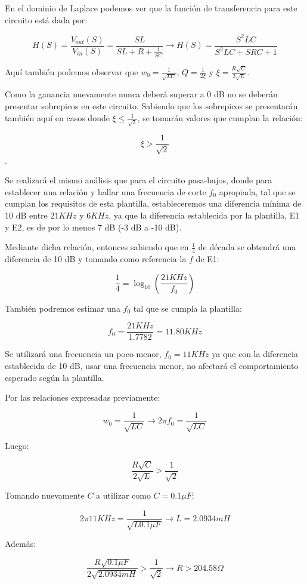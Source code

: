 En el dominio de Laplace podemos ver que la función de transferencia para este circuito está dada por:

$$H(S)=\frac{V_{out}(S)}{V_{in}(S)}=\frac{SL}{SL+R+\frac{1}{SC}} \longrightarrow H(S)=\frac{S^{2}LC}{S^2LC+SRC+1}$$

Aquí también podemos observar que $w_0=\frac{1}{\sqrt{LC}}$, $Q=\frac{1}{2\xi}$ y $\xi=\frac{R\sqrt{C}}{2\sqrt{L}}$.

Como la ganancia nuevamente nunca deberá superar a 0 dB no se deberán presentar sobrepicos en este circuito.
Sabiendo que los sobrepicos se presentarán también aquí en casos donde $\xi \leq \frac{1}{\sqrt{2}}$, se tomarán valores que cumplan la relación:

$$\xi > \frac{1}{\sqrt{2}}$$.

Se realizará el mismo análisis que para el circuito pasa-bajos, donde para establecer una relación y hallar una frecuencia de corte $f_0$ apropiada, tal que se cumplan los requisitos
de esta plantilla, estableceremos una diferencia mínima de 10 dB entre $21 KHz$ y $6 KHz$, ya que la diferencia establecida por la plantilla, E1 y E2,
es de por lo menos 7 dB (-3 dB a -10 dB).

Mediante dicha relación, entonces sabiendo que en $\frac{1}{4}$ de década se obtendrá una diferencia de 10 dB y tomando como referencia 
la $f$ de E1:

$$\frac{1}{4}=\log_{10}(\frac{21KHz}{f_0})$$

También podremos estimar una $f_0$ tal que se cumpla la plantilla:

$$f_0 = \frac{21KHz}{1.7782} = 11.80 KHz$$

Se utilizará una frecuencia un poco menor, $f_0=11 KHz$ ya que con la diferencia establecida de 10 dB, usar una frecuencia menor, no afectará el comportamiento 
esperado según la plantilla.

Por las relaciones expresadas previamente:

$$w_0=\frac{1}{\sqrt{LC}} \longrightarrow 2\pi f_0=\frac{1}{\sqrt{LC}}$$

Luego:

$$\frac{R\sqrt{C}}{2\sqrt{L}} > \frac{1}{\sqrt{2}}$$

Tomando nuevamente $C$ a utilizar como $C=0.1\mu F$: 

$$2\pi 11KHz=\frac{1}{\sqrt{L0.1 \mu F}} \longrightarrow L = 2.0934 mH$$

Además:

$$\frac{R\sqrt{0.1\mu F}}{2\sqrt{2.0934mH}} > \frac{1}{\sqrt{2}} \longrightarrow R > 204.58 \Omega $$

